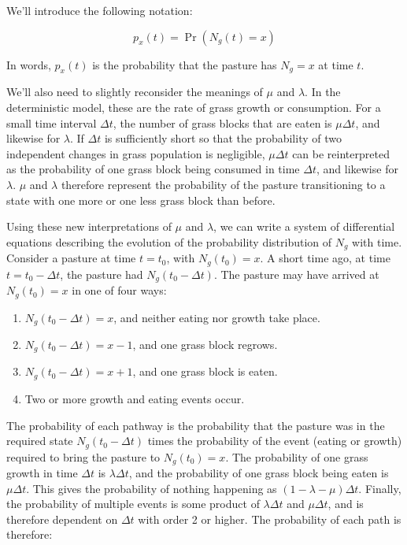 \documentclass{article}
\begin{document}
We'll introduce the following notation:

$$p_x(t)=\Pr(N_g(t)=x)$$

In words, $p_x(t)$ is the probability that the pasture has $N_g=x$ at time $t$.

We'll also need to slightly reconsider the meanings of $\mu$ and $\lambda$. In the deterministic model, these are the rate of grass growth or consumption. For a small time interval $\Delta t$, the number of grass blocks that are eaten is $\mu\Delta t$, and likewise for $\lambda$. If $\Delta t$ is sufficiently short so that the probability of two independent changes in grass population is negligible, $\mu\Delta t$ can be reinterpreted as the probability of one grass block being consumed in time $\Delta t$, and likewise for $\lambda$. $\mu$ and $\lambda$ therefore represent the probability of the pasture transitioning to a state with one more or one less grass block than before.

Using these new interpretations of $\mu$ and $\lambda$, we can write a system of differential equations describing the evolution of the probability distribution of $N_g$ with time. Consider a pasture at time $t=t_0$, with $N_g(t_0)=x$. A short time ago, at time $t=t_0-\Delta t$, the pasture had $N_g(t_0-\Delta t)$. The pasture may have arrived at $N_g(t_0)=x$ in one of four ways:

\begin{enumerate}
    \item $N_g(t_0-\Delta t)=x$, and neither eating nor growth take place.
    \item $N_g(t_0-\Delta t)=x-1$, and one grass block regrows.
    \item $N_g(t_0-\Delta t)=x+1$, and one grass block is eaten.
    \item Two or more growth and eating events occur.
\end{enumerate}

The probability of each pathway is the probability that the pasture was in the required state $N_g(t_0-\Delta t)$ times the probability of the event (eating or growth) required to bring the pasture to $N_g(t_0)=x$. The probability of one grass growth in time $\Delta t$ is $\lambda\Delta t$, and the probability of one grass block being eaten is $\mu\Delta t$. This gives the probability of nothing happening as $(1-\lambda-\mu)\Delta t$. Finally, the probability of multiple events is some product of $\lambda\Delta t$ and $\mu\Delta t$, and is therefore dependent on $\Delta t$ with order 2 or higher. The probability of each path is therefore:
\end{document}
